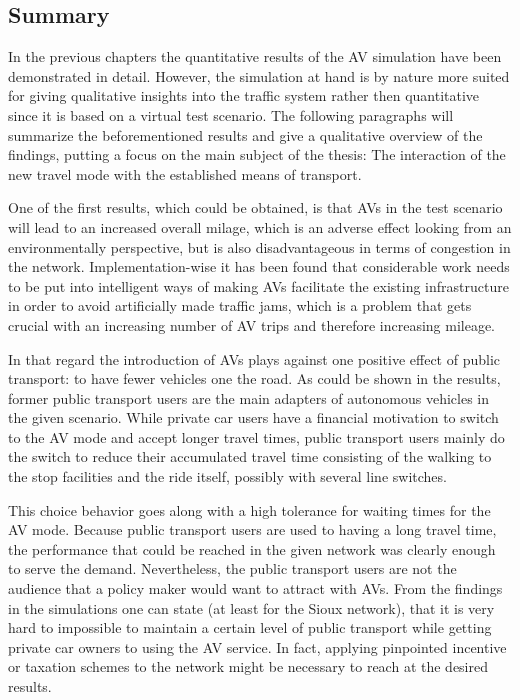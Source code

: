 \subsection{Summary}

In the previous chapters the quantitative results of the AV simulation have been
demonstrated in detail. However, the simulation at hand is by nature more suited
for giving qualitative insights into the traffic system rather then quantitative
since it is based on a virtual test scenario. The following paragraphs will
summarize the beforementioned results and give a qualitative overview of the
findings, putting a focus on the main subject of the thesis: The interaction of
the new travel mode with the established means of transport.

One of the first results, which could be obtained, is that AVs in the test
scenario will lead to an increased overall milage, which is an adverse effect
looking from an environmentally perspective, but is also disadvantageous in
terms of congestion in the network. Implementation-wise it has been found that
considerable work needs to be put into intelligent ways of making AVs facilitate
the existing infrastructure in order to avoid artificially made traffic jams,
which is a problem that gets crucial with an increasing number of AV trips
and therefore increasing mileage.

In that regard the introduction of AVs plays against one positive effect of
public transport: to have fewer vehicles one the road. As could be shown in the
results, former public transport users are the main adapters of autonomous vehicles
in the given scenario. While private car users have a financial motivation to switch
to the AV mode and accept longer travel times, public transport users mainly do
the switch to reduce their accumulated travel time consisting of the walking
to the stop facilities and the ride itself, possibly with several line switches.

This choice behavior goes along with a high tolerance for waiting times for the
AV mode. Because public transport users are used to having a long travel time,
the performance that could be reached in the given network was clearly enough
to serve the demand. Nevertheless, the public transport users are not the
audience that a policy maker would want to attract with AVs. From the findings
in the simulations one can state (at least for the Sioux network), that it is
very hard to impossible to maintain a certain level of public transport while
getting private car owners to using the AV service. In fact, applying pinpointed
incentive or taxation schemes to the network might be necessary to reach at the
desired results.


